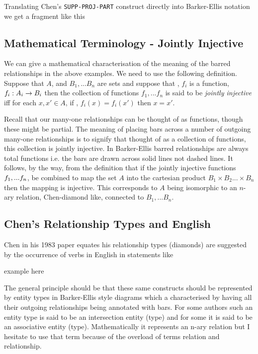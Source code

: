 \mynote 
Translating Chen's \verb'SUPP-PROJ-PART' construct directly into Barker-Ellis notation we get a fragment like this
\begin{center}
\scalebox{0.95}{}
\end{center}


\subsection*{Mathematical Terminology - Jointly Injective}
\label{JointlyInjective}
\mynote
We can give a mathematical characterisation of the meaning of the barred relationships in the above examples.
We need to use the following definition.
Suppose that $A$, and $B_1,...B_n$ are sets and suppose that \foreachi, $f_i$ is a function, $f_i:A_i \rightarrow B_i$ 
then the collection of functions $f_1,...f_n$ is said to be \textit{jointly injective}
iff for each $x,x' \in A$, if \foreachi, $f_i(x)=f_i(x')$ then $x=x'$.

Recall that our many-one relationships can be thought of as functions, though these might be partial.
The meaning of placing bars across a number of outgoing many-one relationships is to signify that thought of as a collection of functions, this collection is jointly injective. In Barker-Ellis barred relationships are always total functions i.e. the bars are drawn across solid lines not dashed lines.
\mynote
It follows, by the way, from the definition that if the jointly injective functions $f_1,...f_n$, be combined
to map the set $A$ into the cartesian product $B_1 \times B_2 ... \times B_n$
then the mapping is injective. This corresponds to $A$ being isomorphic to an $n$-ary relation,
Chen-diamond like, connected to $B_1,...B_n$.

\subsection*{Chen's Relationship Types and English}
\mynote
Chen in his 1983 paper equates his relationship types (diamonds) are suggested by
the occurrence of verbs in English in statements like
\begin{center}
example here
\end{center}

The general principle should be that these same constructs should be 
represented by entity types in Barker-Ellis style diagrams which a characterised by having
all their outgoing relationships being  annotated with bars.
For some authors such an entity type is said to be an intersection entity (type)
and for some it is said to be an associative entity (type). Mathematically it represents an n-ary relation but I hesitate to use that term because of the overload of terms relation and relationship. 


